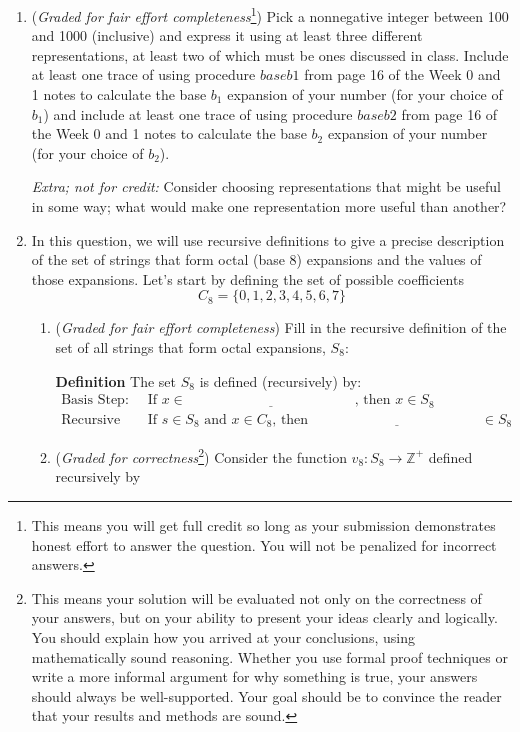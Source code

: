 \documentclass[12pt, oneside]{article}
\begin{document}
\begin{enumerate}
    \item ({\it Graded for fair effort completeness}\footnote{This means 
    you will get full credit so long as your submission demonstrates honest 
    effort to answer the question. You will not be penalized for incorrect answers.})
    Pick a nonnegative integer between 100 and 1000 (inclusive) and express it using at 
    least three different representations, 
    at least two of which must be ones discussed in class. Include at least one
    trace of using procedure $baseb1$ from page 16 of the Week 0 and 1 notes
    to calculate the base $b_1$ expansion of your
    number (for your choice of $b_1$) and include at least one trace of using 
    procedure $baseb2$ from page 16 of the Week 0 and 1 notes
    to calculate the base $b_2$ expansion of your number
    (for your choice of $b_2$). 
    
    {\it Extra; not for credit:} Consider choosing representations that might be useful in 
    some way; what would make one representation more useful than another?

    \newpage
    \item In this question, we will use recursive definitions to give a precise description 
    of the set of strings that form octal (base $8$) expansions and the values
    of those expansions. Let's start by defining the set of possible coefficients
    \[
        C_8 = \{ 0, 1, 2, 3, 4, 5, 6, 7\}
    \]

    \begin{enumerate}
    \item ({\it Graded for fair effort completeness}) Fill in the recursive definition of the 
    set of all strings that form octal expansions, $S_8$: 
    
    {\bf Definition} The set $S_8$ is defined (recursively) by:
    \[
    \begin{array}{ll}
    \textrm{Basis Step: } & \textrm{If } x \in \underline{\phantom{\hspace{2in}}} \textrm{, then } x \in S_8\\
    \textrm{Recursive Step: } & \textrm{If } s \in S_8 \textrm{ and } x \in C_8 \textrm{, then }
    \underline{\phantom{\hspace{2in}}} \in S_8
    \end{array}
    \]
    
    \item  ({\it Graded for correctness}\footnote{This means your solution will be
    evaluated not only on the correctness of your answers, but on your ability to 
    present your ideas clearly and logically. You should explain how you arrived at 
    your conclusions, using 
    mathematically sound reasoning. Whether you use formal proof techniques or 
    write a more informal argument for why 
    something is true, your answers should always be well-supported. Your goal 
    should be to convince the reader that 
    your results and methods are sound.})
    Consider the function $v_8: S_8 \to \mathbb{Z}^+$ defined recursively by 
    

\end{enumerate}
\end{enumerate}
\end{document}

